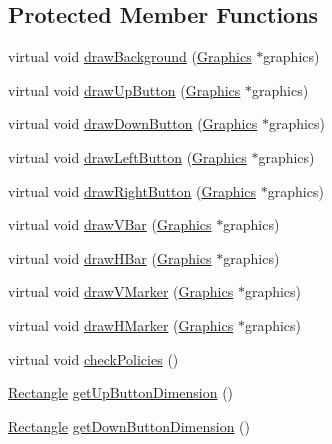 \subsection*{Protected Member Functions}
\begin{DoxyCompactItemize}
\item 
virtual void \hyperlink{classgcn_1_1ScrollArea_a13f3019e9b126831580fee0b74e34861}{draw\+Background} (\hyperlink{classgcn_1_1Graphics}{Graphics} $\ast$graphics)
\item 
virtual void \hyperlink{classgcn_1_1ScrollArea_aeb5d4e317104042c6fa42fad9f4099e5}{draw\+Up\+Button} (\hyperlink{classgcn_1_1Graphics}{Graphics} $\ast$graphics)
\item 
virtual void \hyperlink{classgcn_1_1ScrollArea_a891f1e7fad4fff75a560934f1fd2b4c8}{draw\+Down\+Button} (\hyperlink{classgcn_1_1Graphics}{Graphics} $\ast$graphics)
\item 
virtual void \hyperlink{classgcn_1_1ScrollArea_ad164275f835bfd8801e8bb8e2980ff56}{draw\+Left\+Button} (\hyperlink{classgcn_1_1Graphics}{Graphics} $\ast$graphics)
\item 
virtual void \hyperlink{classgcn_1_1ScrollArea_ab281bc5acbad8a41310952e63ac8db38}{draw\+Right\+Button} (\hyperlink{classgcn_1_1Graphics}{Graphics} $\ast$graphics)
\item 
virtual void \hyperlink{classgcn_1_1ScrollArea_a86f51c2c526ddd86c9cfa8eea037ac27}{draw\+V\+Bar} (\hyperlink{classgcn_1_1Graphics}{Graphics} $\ast$graphics)
\item 
virtual void \hyperlink{classgcn_1_1ScrollArea_a46f7c9efdae6649e16995dc8e3f5f996}{draw\+H\+Bar} (\hyperlink{classgcn_1_1Graphics}{Graphics} $\ast$graphics)
\item 
virtual void \hyperlink{classgcn_1_1ScrollArea_ad918479bb482a9b7d25748b6eb8cdd86}{draw\+V\+Marker} (\hyperlink{classgcn_1_1Graphics}{Graphics} $\ast$graphics)
\item 
virtual void \hyperlink{classgcn_1_1ScrollArea_a1d5926cbd302d01c495e4bb0c1ed760b}{draw\+H\+Marker} (\hyperlink{classgcn_1_1Graphics}{Graphics} $\ast$graphics)
\item 
virtual void \hyperlink{classgcn_1_1ScrollArea_a247838f8490a284cb215d50ab78e573d}{check\+Policies} ()
\item 
\hyperlink{classgcn_1_1Rectangle}{Rectangle} \hyperlink{classgcn_1_1ScrollArea_afb4d37de0b2b511db0e5ee7e41e601c5}{get\+Up\+Button\+Dimension} ()
\item 
\hyperlink{classgcn_1_1Rectangle}{Rectangle} \hyperlink{classgcn_1_1ScrollArea_a59b7fda7e81c3290db7de1a4c759ac7d}{get\+Down\+Button\+Dimension} ()

\end{DoxyCompactItemize}
